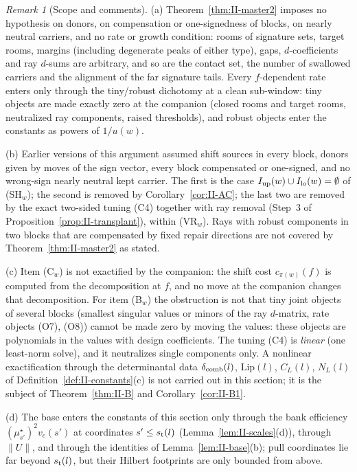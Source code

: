 \documentclass[10pt]{amsart}
\theoremstyle{definition}
\theoremstyle{remark}
\newtheorem{remark}[theorem]{Remark}
\begin{document}
\begin{remark}[Scope and comments]\label{rem:II-master2}
(a) Theorem~\ref{thm:II-master2} imposes no hypothesis on donors, on
compensation or one-signedness of blocks, on nearly neutral carriers, and
no rate or growth condition: rooms of signature sets, target rooms,
margins (including degenerate peaks of either type), gaps, $d$-coefficients
and ray $d$-sums are arbitrary, and so are the contact set, the number of
swallowed carriers and the alignment of the far signature tails.  Every
$f$-dependent rate enters only through the tiny/robust dichotomy at a clean
sub-window: tiny objects are made exactly zero at the companion (closed
rooms and target rooms, neutralized ray components, raised thresholds), and
robust objects enter the constants as powers of $1/u(w)$.

(b) Earlier versions of this argument assumed shift sources in every block,
donors given by moves of the sign vector, every block compensated or
one-signed, and no wrong-sign nearly neutral kept carrier.  The first is the
case $I_{\rm up}(w)\cup I_{\rm lo}(w)=\emptyset$ of (SH$_w$); the second is
removed by Corollary~\ref{cor:II-AC}; the last two are removed by the exact
two-sided tuning (C4) together with ray removal (Step~3 of
Proposition~\ref{prop:II-transplant}), within (VR$_w$).  Rays with robust
components in two blocks that are compensated by fixed repair directions are
not covered by Theorem~\ref{thm:II-master2} as stated.

(c) Item (C$_w$) is not exactified by the companion: the shift cost
$c_{\pi(w)}(f)$ is computed from the decomposition at $f$, and no move at the
companion changes that decomposition.  For item (B$_w$) the obstruction is
not that tiny joint objects of several blocks (smallest singular values or
minors of the ray $d$-matrix, rate objects (O7), (O8)) cannot be made zero by
moving the values: these objects are polynomials in the values with design
coefficients.  The tuning (C4) is \emph{linear} (one least-norm solve), and
it neutralizes single components only.  A nonlinear exactification through
the determinantal data $\delta_{\rm comb}(l)$, $\mathrm{Lip}(l)$, $C_L(l)$,
$N_L(l)$ of Definition~\ref{def:II-constants}(c) is not carried out in this
section; it is the subject of Theorem~\ref{thm:II-B} and
Corollary~\ref{cor:II-B1}.

(d) The base enters the constants of this section only through the bank
efficiency $(\mu^\star_{s'})^2v_c(s')$ at coordinates $s'\le s_{\rm t}(l)$
(Lemma~\ref{lem:II-scales}(d)), through $\|U\|$, and through the identities
of Lemma~\ref{lem:II-base}(b); pull coordinates lie far beyond
$s_{\rm t}(l)$, but their Hilbert footprints are only bounded from above.
\end{remark}
\end{document}
